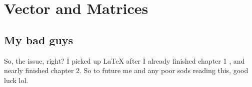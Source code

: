 \chapter{Vector and Matrices}
\section{My bad guys}
So, the issue, right? I picked up LaTeX after I already finished chapter 1
, and nearly finished chapter 2. So to future me and any poor sods
reading this, good luck lol.